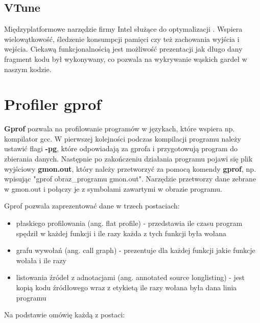 \documentclass[shortabstract]{iithesis}
\theoremstyle{definition} \newtheorem*{definition}{Definicja}
\theoremstyle{definition} \newtheorem*{example}{Przykład}
\theoremstyle{definition} \newtheorem*{remark}{Uwaga}
\begin{document}
\subsection{VTune}

Międzyplatformowe narzędzie firmy Intel służące do optymalizacji \cite{bib:vtune}. Wspiera wielowątkowość, śledzenie konsumpcji pamięci czy też zachowania wyjścia i wejścia. Ciekawą funkcjonalnością jest możliwość prezentacji jak długo dany fragment kodu był wykonywany, co pozwala na wykrywanie wąskich gardeł w naszym kodzie.

\section{Profiler gprof}

\textbf{Gprof} pozwala na profilowanie programów w językach, które wspiera np. kompilator gcc. W pierwszej kolejności podczas kompilacji programu należy ustawić flagi \textbf{-pg}, które odpowiadają za gprofa i przygotowują program do zbierania danych. Następnie po zakończeniu działania programu pojawi się plik wyjściowy \textbf{gmon.out}, który należy przetworzyć za pomocą komendy \textbf{gprof}, np. wpisując "gprof obraz\_programu gmon.out". Narzędzie przetworzy dane zebrane w gmon.out i połączy je z symbolami zawartymi w obrazie programu.

Gprof pozwala zaprezentować dane w trzech postaciach:
\begin{itemize}
    \item płaskiego profilowania (ang. flat profile) - przedstawia ile czasu program spędził w każdej funkcji i ile razy każda z tych funkcji była wołana
    \item grafu wywołań (ang. call graph) - prezentuje dla każdej funkcji jakie funkcje wołała i ile razy
    \item listowania źródeł z adnotacjami (ang. annotated source longlisting) - jest kopią kodu źródłowego wraz z etykietą ile razy wołana była dana linia programu
\end{itemize}

Na podstawie \cite{bib:gprof-out} omówię każdą z postaci:
\end{document}
